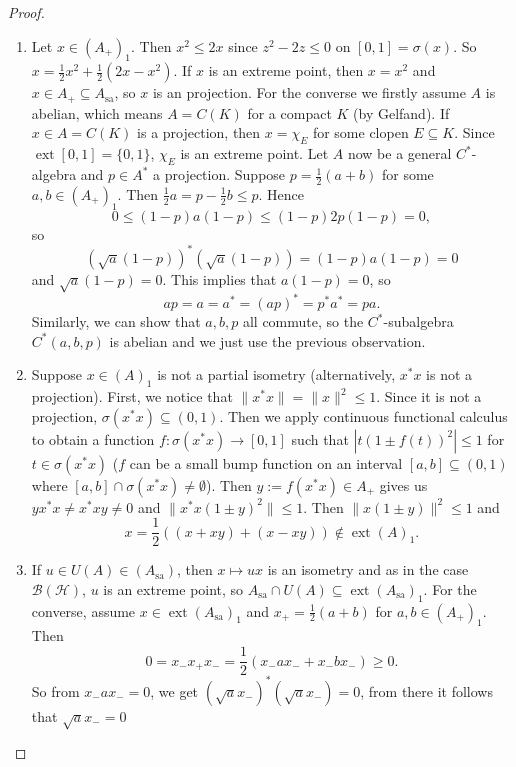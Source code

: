 \documentclass[10pt, a4paper]{article}
\newenvironment{noticeC}{%
  \tcolorbox[%
  notitle,
  empty,
  enhanced,  %
  breakable,
  coltext=black, 
  fontupper=\rmfamily,
  noparskip,
  sharp corners,
  boxrule=-1pt,  %
  frame hidden,
  left=7pt,  %
  right=7pt,
  top=5pt,
  bottom=5pt,
  before skip=2.5ex plus 2pt,
  after skip=2.5ex plus 2pt,
  overlay unbroken and last={%
  },
  ]}
{\endtcolorbox}
\newenvironment{myproof}%
  {\begin{noticeC}\begin{proof}}%
  {\end{proof}\end{noticeC}}
\DeclareMathOperator{\ext}{ext}
\DeclareMathOperator{\sa}{sa}
\begin{document}
\begin{myproof}
  \begin{enumerate}
    \item Let $x \in (A_+)_1$. Then $x^2 \leq 2x$ since $z^2 - 2z \leq 0$ on $[0, 1] = \sigma(x)$.
    So $x = \frac{1}{2} x^2 + \frac{1}{2} (2x - x^2)$.
    If $x$ is an extreme point, then $x = x^2$ and $x \in A_+ \subseteq A_{\sa}$, so $x$ is an projection.
    For the converse we firstly assume $A$ is abelian, which means $A = C(K)$
    for a compact $K$ (by Gelfand). If $x \in A = C(K)$ is a projection, then $x = \chi_{E}$
    for some clopen $E \subseteq K$. Since $\ext [0, 1] = \{0, 1\}$, $\chi_E$ is an extreme point.
    Let $A$ now be a general $C^*$-algebra and $p \in A^*$ a projection. Suppose $p = \frac{1}{2} (a + b)$
    for some $a, b \in (A_+)_1$. Then $\frac{1}{2} a = p - \frac{1}{2} b \leq p$.
    Hence 
    $$0 \leq (1 - p)a(1 - p) \leq (1 - p) 2p (1 - p) = 0,$$
    so $$(\sqrt{a} (1 - p))^* (\sqrt{a} (1 - p)) = (1 - p)a(1 - p) = 0$$
    and $\sqrt{a} (1 - p) = 0$. This implies that $a (1 - p) = 0$, so 
    $$ap = a = a^* = (ap)^* = p^* a^* = pa.$$
    Similarly, we can show that $a, b, p$ all commute, so the $C^*$-subalgebra $C^*(a, b, p)$ is abelian and we just use the previous observation.
    \item Suppose $x \in (A)_1$ is not a partial isometry (alternatively, $x^* x$ is not a projection).
    First, we notice that $\| x^* x\| = \|x\|^2 \leq 1$. Since it is not a projection, $\sigma(x^* x) \subseteq (0, 1)$.
    Then we apply continuous functional calculus to obtain a function $f: \sigma(x^* x) \to [0, 1]$ such that 
    $|t (1 \pm f(t))^2| \leq 1$ for $t \in \sigma(x^* x)$ ($f$ can be a small bump function on an interval $[a, b] \subseteq (0, 1)$ where $[a, b] \cap \sigma(x^* x) \neq \emptyset$).
    Then $y := f(x^* x) \in A_+$ gives us $yx^* x \neq x^* x y \neq 0$
    and $\|x^* x (1 \pm y)^2\| \leq 1$. Then $\|x (1 \pm y)\|^2 \leq 1$ and 
    $$x = \frac{1}{2} ((x + xy) + (x - xy)) \notin \ext(A)_1.$$
    \item If $u \in U(A) \in (A_{\sa})$, then $x \mapsto ux$ is an isometry and as in the case $\mathcal{B}(\mathcal{H})$,
    $u$ is an extreme point, so $A_{\sa} \cap U(A) \subseteq \ext (A_{\sa})_1$. For the converse, assume 
    $x \in \ext (A_{\sa})_1$ and $x_+ = \frac{1}{2} (a + b)$ for $a, b \in (A_+)_{1}$. Then 
    $$0 = x_- x_+ x_- = \frac{1}{2} (x_- a x_- + x_- b x_-) \geq 0.$$
    So from $x_- a x_- = 0$, we get $(\sqrt{a} x_-)^* (\sqrt{a} x_-) = 0$, from there it follows that $\sqrt{a} x_- = 0$

\end{enumerate}
\end{myproof}
\end{document}
